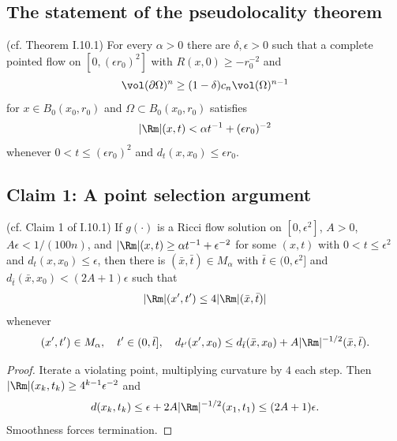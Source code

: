 \subsection{The statement of the pseudolocality theorem}
\label{statement of I.10.1}
\begin{theorem}
  \label{thm:kl-statement-pseudolocality-theorem-pseudolocality-theorem}
  (cf. Theorem I.10.1) \label{thmI.10.1}
For every $\alpha>0$ there are $\delta,\epsilon>0$ such that a complete pointed
flow on $[0,(\epsilon r_0)^2]$ with
$R(x,0)\ge-r_0^{-2}$ and
\begin{equation}
\vol(\partial\Omega)^n\ge(1-\delta)c_n\vol(\Omega)^{n-1}
\end{equation}
for $x\in B_0(x_0,r_0)$ and $\Omega\subset B_0(x_0,r_0)$ satisfies
\begin{equation}
|\Rm|(x,t)<\alpha t^{-1}+(\epsilon r_0)^{-2}
\end{equation}
whenever $0<t\le(\epsilon r_0)^2$ and $d_t(x,x_0)\le\epsilon r_0$.
\end{theorem}

\subsection{Claim 1: A point selection argument}
\begin{lemma}
  \label{lem:kl-point-selection-argument-point-selection-argument-lemma}
  (cf. Claim 1 of I.10.1) \label{Claim 1}
If $g(\cdot)$ is a Ricci flow solution on $[0,\epsilon^2]$, $A>0$,
$A\epsilon<1/(100n)$, and
$|\Rm|(x,t)\ge\alpha t^{-1}+\epsilon^{-2}$ for some $(x,t)$ with
$0<t\le\epsilon^2$ and $d_t(x,x_0)\le\epsilon$, then there is
$(\bar x,\bar t)\in M_\alpha$ with $\bar t\in(0,\epsilon^2]$ and
$d_{\bar t}(\bar x,x_0)<(2A+1)\epsilon$ such that
\begin{equation}\label{I.(10.1)}|\Rm|(x',t')\le4|\Rm|(\bar x,\bar t)|\end{equation}
whenever
\begin{equation}\label{I.(10.2)}(x',t')\in M_\alpha,\quad t'\in(0,\bar t],\quad
d_{t'}(x',x_0)\le d_{\bar t}(\bar x,x_0)+A|\Rm|^{-1/2}(\bar x,\bar t).
\end{equation}
\end{lemma}
\begin{proof}
\sketch
Iterate a violating point, multiplying curvature by $4$ each step. Then
$|\Rm|(x_k,t_k)\ge4^{k-1}\epsilon^{-2}$ and
\begin{equation}d(x_k,t_k)\le\epsilon+2A|\Rm|^{-1/2}(x_1,t_1)\le(2A+1)\epsilon.
\end{equation}
Smoothness forces termination.
\end{proof}

